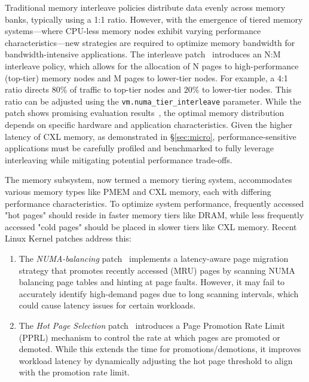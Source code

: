 Traditional memory interleave policies distribute data evenly across memory banks, typically using a 1:1 ratio. However, with the emergence of tiered memory systems—where CPU-less memory nodes exhibit varying performance characteristics—new strategies are required to optimize memory bandwidth for bandwidth-intensive applications. The interleave patch~\cite{Interleavepatch} introduces an N:M interleave policy, which allows for the allocation of N pages to high-performance (top-tier) memory nodes and M pages to lower-tier nodes. For example, a 4:1 ratio directs $80\%$ of traffic to top-tier nodes and $20\%$ to lower-tier nodes. This ratio can be adjusted using the \texttt{vm.numa\_tier\_interleave} parameter. While the patch shows promising evaluation results~\cite{Interleavepatch}, the optimal memory distribution depends on specific hardware and application characteristics. Given the higher latency of CXL memory, as demonstrated in \S\ref{sec:micro}, performance-sensitive applications must be carefully profiled and benchmarked to fully leverage interleaving while mitigating potential performance trade-offs.


The memory subsystem, now termed a memory tiering system, accommodates various memory types like PMEM and CXL memory, each with differing performance characteristics. To optimize system performance, frequently accessed "hot pages" should reside in faster memory tiers like DRAM, while less frequently accessed "cold pages" should be placed in slower tiers like CXL memory. Recent Linux Kernel patches address this:

\begin{enumerate}[leftmargin=*, itemsep=0pt]
    \item The \textit{NUMA-balancing} patch~\cite{numaautobalancing} implements a latency-aware page migration strategy that promotes recently accessed (MRU) pages by scanning NUMA balancing page tables and hinting at page faults. However, it may fail to accurately identify high-demand pages due to long scanning intervals, which could cause latency issues for certain workloads.
    \item The \textit{Hot Page Selection} patch~\cite{hot} introduces a Page Promotion Rate Limit (PPRL) mechanism to control the rate at which pages are promoted or demoted. While this extends the time for promotions/demotions, it improves workload latency by dynamically adjusting the hot page threshold to align with the promotion rate limit.
\end{enumerate}

